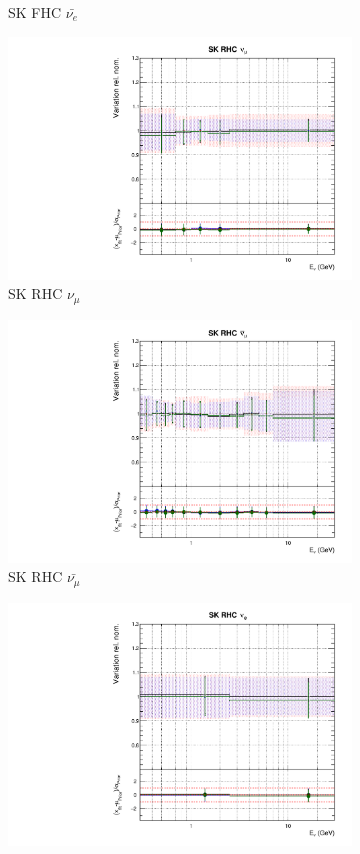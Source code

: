 \begin{figure}
\begin{subfigure}{0.45\textwidth}
  \caption{SK FHC $\bar{\nu_{e}}$}
\end{subfigure}
\begin{subfigure}{0.45\textwidth}
  \centering
  \includegraphics[width=0.75\linewidth]{figs/polyasmvsflux_12}
  \caption{SK RHC $\nu_{\mu}$}
\end{subfigure}
\begin{subfigure}{0.45\textwidth}
  \centering
  \includegraphics[width=0.75\linewidth]{figs/polyasmvsflux_13}
  \caption{SK RHC $\bar{\nu_{\mu}}$}
\end{subfigure}
\begin{subfigure}{0.45\textwidth}
  \centering
  \includegraphics[width=0.75\linewidth]{figs/polyasmvsflux_14}

\end{subfigure}
\end{figure}
